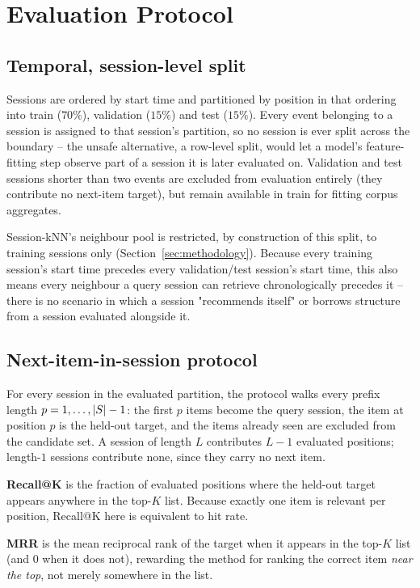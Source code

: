 \section{Evaluation Protocol}
\label{sec:evaluation}

\subsection{Temporal, session-level split}

Sessions are ordered by start time and partitioned by position in that
ordering into train ($70\%$), validation ($15\%$) and test ($15\%$). Every
event belonging to a session is assigned to that session's partition, so no
session is ever split across the boundary -- the unsafe alternative, a
row-level split, would let a model's feature-fitting step observe part of a
session it is later evaluated on. Validation and test sessions shorter than
two events are excluded from evaluation entirely (they contribute no
next-item target), but remain available in train for fitting corpus
aggregates.

Session-kNN's neighbour pool is restricted, by construction of this split, to
training sessions only (Section~\ref{sec:methodology}). Because every
training session's start time precedes every validation/test session's start
time, this also means every neighbour a query session can retrieve
chronologically precedes it -- there is no scenario in which a session
"recommends itself" or borrows structure from a session evaluated alongside
it.

\subsection{Next-item-in-session protocol}

For every session in the evaluated partition, the protocol walks every
prefix length $p = 1, \dots, |S| - 1$: the first $p$ items become the
query session, the item at position $p$ is the held-out target, and the
items already seen are excluded from the candidate set. A session of length
$L$ contributes $L - 1$ evaluated positions; length-$1$ sessions contribute
none, since they carry no next item.

\textbf{Recall@K} is the fraction of evaluated positions where the held-out
target appears anywhere in the top-$K$ list. Because exactly one item is
relevant per position, Recall@K here is equivalent to hit rate.

\textbf{MRR} is the mean reciprocal rank of the target when it appears in the
top-$K$ list (and $0$ when it does not), rewarding the method for ranking the
correct item \emph{near the top}, not merely somewhere in the list.

